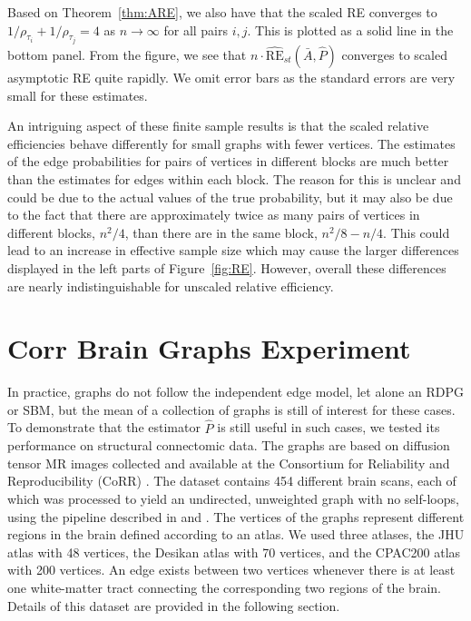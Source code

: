 Based on Theorem~\ref{thm:ARE}, we also have that the scaled RE converges to $1/\rho_{\tau_i}+1/\rho_{\tau_j}=4$ as $n \to\infty$ for all pairs $i,j$.
This is plotted as a solid line in the bottom panel.
From the figure, we see that $n \cdot \hat{\mathrm{RE}}_{st}(\bar{A}, \hat{P})$ converges to scaled asymptotic RE quite rapidly.
We omit error bars as the standard errors are very small for these estimates.

\begin{remark}
An intriguing aspect of these finite sample results is that the scaled relative efficiencies behave differently for small graphs with fewer vertices. 
The estimates of the edge probabilities for pairs of vertices in different blocks are much better than the estimates for edges within each block.
The reason for this is unclear and could be due to the actual values of the true probability, but it may also be due to the fact that there are approximately twice as many pairs of vertices in different blocks, $n^2/4$, than there are in the same block, $n^2/8-n/4$.
This could lead to an increase in effective sample size which may cause the larger differences displayed in the left parts of Figure~\ref{fig:RE}.
However, overall these differences are nearly indistinguishable for unscaled relative efficiency.
\end{remark}






\section{Corr Brain Graphs Experiment}
\label{sec:LLG_corr_data}

In practice, graphs do not follow the independent edge model, let alone an RDPG or SBM, but the mean of a collection of graphs is still of interest for these cases.
To demonstrate that the estimator $\hat{P}$ is still useful in such cases, we tested its performance on structural connectomic data. 
The graphs are based on diffusion tensor MR images collected and available at the Consortium for Reliability and Reproducibility (CoRR) \citep{zuo2014open, gorgolewski2015high}.
The dataset contains 454 different brain scans, each of which was processed to yield an undirected, unweighted graph with no self-loops, using the pipeline described in \citet{roncal2013migraine} and \citet{kiar2016m2g}.
The vertices of the graphs represent different regions in the brain defined according to an atlas.
We used three atlases, the JHU atlas with 48 vertices, the Desikan atlas with 70 vertices, and the  CPAC200 atlas with 200 vertices.
An edge exists between two vertices whenever there is at least one white-matter tract connecting the corresponding two regions of the brain. 
Details of this dataset are provided in the following section.


